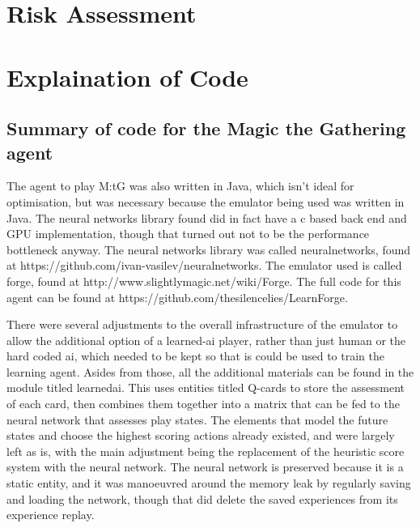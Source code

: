\appendix
\newpage
\section{Risk Assessment}
\newpage


\section{Explaination of Code}

\subsection{Summary of code for the Magic the Gathering agent}
The agent to play M:tG was also written in Java, which isn't ideal for optimisation, but was necessary because the emulator being used was written in Java. The neural networks library found did in fact have a c based back end and GPU implementation, though that turned out not to be the performance bottleneck anyway. The neural networks library was called neuralnetworks, found at https://github.com/ivan-vasilev/neuralnetworks. The emulator used is called forge, found at http://www.slightlymagic.net/wiki/Forge. The full code for this agent can be found at https://github.com/thesilencelies/LearnForge. 

There were several adjustments to the overall infrastructure of the emulator to allow the additional option of a learned-ai player, rather than just human or the hard coded ai, which needed to be kept so that is could be used to train the learning agent. Asides from those, all the additional materials can be found in the module titled learnedai. This uses entities titled Q-cards to store the assessment of each card, then combines them together into a matrix that can be fed to the neural network that assesses play states. The elements that model the future states and choose the highest scoring actions already existed, and were largely left as is, with the main adjustment being the replacement of the heuristic score system with the neural network.
The neural network is preserved because it is a static entity, and it was manoeuvred around the memory leak by regularly saving and loading the network, though that did delete the saved experiences from its experience replay.

